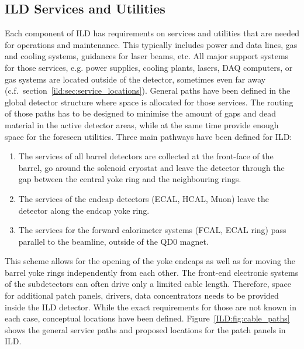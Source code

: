 \subsection{ILD Services and Utilities}
\label{ild:sec:services}
Each component of ILD has requirements on services and utilities that are needed for operations and maintenance. This typically includes power and data lines, gas and cooling systems, guidances for laser beams, etc. All major support systems for those services, e.g. power supplies, cooling plants, lasers, DAQ computers, or gas systems are located outside of the detector, sometimes even far away (c.f.~section~\ref{ild:sec:service_locations}). General paths have been defined in the global detector structure where space is allocated for those services. The routing of those paths has to be designed to minimise the amount of gaps and dead material in the active detector areas, while at the same time provide enough space for the foreseen utilities. Three main pathways have been defined for ILD:
\begin{enumerate}
    \item The services of all barrel detectors are collected at the front-face of the barrel, go around the solenoid cryostat and leave the detector through the gap between the central yoke ring and the neighbouring rings.
    \item The services of the endcap detectors (ECAL, HCAL, Muon) leave the detector along the endcap yoke ring.
    \item The services for the forward calorimeter systems (FCAL, ECAL ring) pass parallel to the beamline, outside of the QD0 magnet.
\end{enumerate}

This scheme allows for the opening of the yoke endcaps as well as for moving the barrel yoke rings independently from each other. The front-end electronic systems of the subdetectors can often drive only a limited cable length. Therefore, space for additional patch panels, drivers, data concentrators needs to be provided inside the ILD detector. While the exact requirements for those are not known in each case, conceptual locations have been defined. Figure~\ref{ILD:fig:cable_paths} shows the general service paths and proposed locations for the patch panels in ILD.

